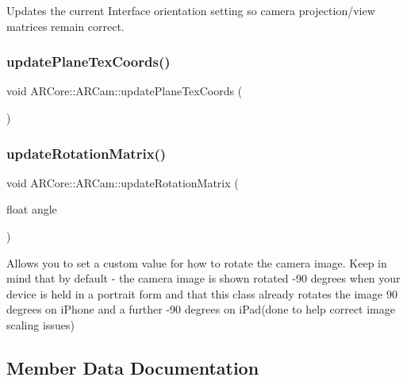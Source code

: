 Updates the current Interface orientation setting so camera projection/view matrices remain correct. 

\mbox{\label{class_a_r_core_1_1_a_r_cam_a577095ff1d35c84708f578d07df5ac33}} 
\subsubsection{\texorpdfstring{update\+Plane\+Tex\+Coords()}{updatePlaneTexCoords()}}
{\footnotesize\ttfamily void A\+R\+Core\+::\+A\+R\+Cam\+::update\+Plane\+Tex\+Coords (\begin{DoxyParamCaption}{ }\end{DoxyParamCaption})}

\mbox{\label{class_a_r_core_1_1_a_r_cam_a1813b2b0f2665741173228ffff518d67}} 
\subsubsection{\texorpdfstring{update\+Rotation\+Matrix()}{updateRotationMatrix()}}
{\footnotesize\ttfamily void A\+R\+Core\+::\+A\+R\+Cam\+::update\+Rotation\+Matrix (\begin{DoxyParamCaption}\item[{float}]{angle }\end{DoxyParamCaption})}

Allows you to set a custom value for how to rotate the camera image. Keep in mind that by default -\/ the camera image is shown rotated -\/90 degrees when your device is held in a portrait form and that this class already rotates the image 90 degrees on i\+Phone and a further -\/90 degrees on i\+Pad(done to help correct image scaling issues) 

\subsection{Member Data Documentation}
\mbox{\label{class_a_r_core_1_1_a_r_cam_ac17d3b7fd12f51b2c54b7241efd36cd4}} 
